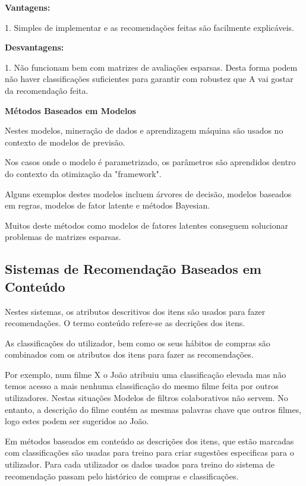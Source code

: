 \textbf{Vantagens:}\hfill
\hfill
\par 1. Simples de implementar e as recomendações feitas são facilmente explicáveis.\newline


\textbf{Desvantagens:}\hfill
\hfill
\par 1. Não funcionam bem com matrizes de avaliações esparsas. Desta forma podem não haver classificações suficientes para garantir com robustez que A vai gostar da recomendação feita.\newline

\begin{center}
\normalsize{\bfseries Métodos Baseados em Modelos}\hfill
\end{center}
\hfill
\par Nestes modelos, mineração de dados e aprendizagem máquina são usados no contexto de modelos de previsão.
\par Nos casos onde o modelo é parametrizado, os parâmetros são aprendidos dentro do contexto da otimização da "framework".
\par Alguns exemplos destes modelos incluem árvores de decisão, modelos baseados em regras, modelos de fator latente e métodos Bayesian.
\par Muitos deste métodos como modelos de fatores latentes conseguem solucionar problemas de matrizes esparsas.

\hfill
\subsection{Sistemas de Recomendação Baseados em Conteúdo}
\hfill
\par Nestes sistemas, os atributos descritivos dos itens são usados para fazer recomendações. O termo conteúdo refere-se as decrições dos itens. 
\par As classificações do utilizador, bem como os seus hábitos de compras são combinados com os atributos dos itens para fazer as recomendações. 
\par Por exemplo, num filme X o João atribuiu uma classificação elevada mas não temos acesso a mais nenhuma classificação do mesmo filme feita por outros utilizadores. Nestas situações Modelos de filtros colaborativos não servem. No entanto, a descrição do filme contém as mesmas palavras chave que outros filmes, logo estes podem ser sugeridos ao João.
\par Em métodos baseados em conteúdo as descrições dos itens, que estão marcadas com classificações são usadas para treino para criar sugestões especificas para o utilizador. Para cada utilizador os dados usados para treino do sistema de recomendação passam pelo histórico de compras e classificações.\newline


